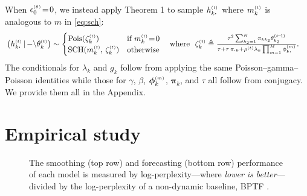 \documentclass{article}
\begin{document}
When $\epstheta \teq0$, we instead apply Theorem 1 to sample $\hkdt$ where $\mkt$ is analogous to $m$ in \cref{eq:sch}:
% 
\begin{align}
\left(\hkdt \given {-\backslash} \thetakt\right) &\sim 
\begin{cases}
\textrm{Pois}(\zeta_{k}^{\mathsmaller{(t)}}) &\textrm{if } \mkt \teq 0 \\ 
% 
\textrm{SCH}(\mkt,\, \zeta_{k}^{\mathsmaller{(t)}}) &\textrm{otherwise}
\end{cases} 
\hspace{1em}\textrm{where }\,\,
\zeta_{k}^{\mathsmaller{(t)}} \triangleq \mathsmaller{\frac{\tau^2 \sum_{k_2=1}^K \pi_{kk_2} \thetakttm}{\tau + \tau\,\pi_{\bcdot k} + \rhot \lambda_k \prod_{m=1}^M\phi^{\mathsmaller{(m)}}_{k\bcdot }}}.
\end{align}
The conditionals for $\lambda_k$ and $g_k$ follow from applying the same Poisson--gamma--Poisson identities while those for $\gamma$, $\beta$, $\boldsymbol{\phi}^{\mathsmaller{(m)}}_k$, $\boldsymbol{\pi}_{k}$, and $\tau$ all follow from conjugacy. We provide them all in the Appendix.~

\section{Empirical study}
\label{sec:empirical}
\begin{figure}[t]
\centering
{}\hfill
% 
\vspace{-0.5em}
\caption{\label{fig:empirical}\footnotesize The smoothing (top row) and forecasting (bottom row) performance of each model is measured by log-perplexity---where \emph{lower is better}---divided by the log-perplexity of a non-dynamic baseline, BPTF \cite{schein2015bayesian}.~}\vspace{-2em}
\end{figure}
\end{document}
